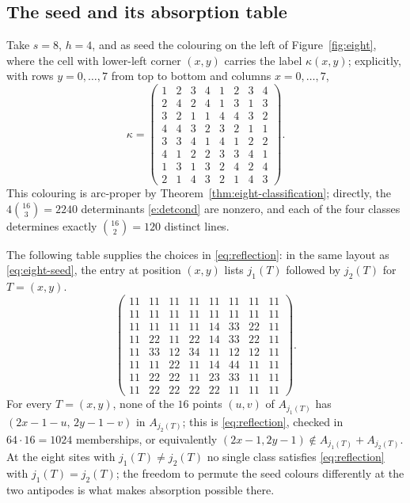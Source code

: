\documentclass[11pt]{article}
\theoremstyle{definition}
\theoremstyle{remark}
\begin{document}
\subsection{The seed and its absorption table}
\label{sec:eight-seed}

Take \(s=8\), \(h=4\), and as seed the colouring on the left of
Figure~\ref{fig:eight}, where the cell with lower-left corner \((x,y)\)
carries the label \(\kappa(x,y)\); explicitly, with rows \(y=0,\ldots,7\)
from top to bottom and columns \(x=0,\ldots,7\),
\begin{equation}\label{eq:eight-seed}
\kappa=
\begin{pmatrix}
1&2&3&4&1&2&3&4\\
2&4&2&4&1&3&1&3\\
3&2&1&1&4&4&3&2\\
4&4&3&2&3&2&1&1\\
3&3&4&1&4&1&2&2\\
4&1&2&2&3&3&4&1\\
1&3&1&3&2&4&2&4\\
2&1&4&3&2&1&4&3
\end{pmatrix}.
\end{equation}
This colouring is arc-proper by Theorem~\ref{thm:eight-classification};
directly, the \(4\binom{16}{3}=2240\) determinants \eqref{e:detcond}
are nonzero, and each of the four classes determines exactly
\(\binom{16}{2}=120\) distinct lines.

The following table supplies the choices in \eqref{eq:reflection}: in the
same layout as \eqref{eq:eight-seed}, the entry at position \((x,y)\)
lists \(j_1(T)\) followed by \(j_2(T)\) for \(T=(x,y)\).
\begin{equation}\label{eq:eight-table}
\begin{pmatrix}
11&11&11&11&11&11&11&11\\
11&11&11&11&11&11&11&11\\
11&11&11&11&14&33&22&11\\
11&22&11&22&14&33&22&11\\
11&33&12&34&11&12&12&11\\
11&11&22&11&14&44&11&11\\
11&22&22&11&23&33&11&11\\
11&22&22&22&22&11&11&11
\end{pmatrix}.
\end{equation}
For every \(T=(x,y)\), none of the \(16\) points \((u,v)\) of
\(A_{j_1(T)}\) has \((2x-1-u,\,2y-1-v)\) in \(A_{j_2(T)}\); this is
\eqref{eq:reflection}, checked in \(64\cdot16=1024\) memberships, or
equivalently \((2x-1,2y-1)\notin A_{j_1(T)}+A_{j_2(T)}\).  At the eight
sites with \(j_1(T)\ne j_2(T)\) no single class satisfies
\eqref{eq:reflection} with \(j_1(T)=j_2(T)\); the freedom to permute the
seed colours differently at the two antipodes is what makes absorption
possible there.
\end{document}
